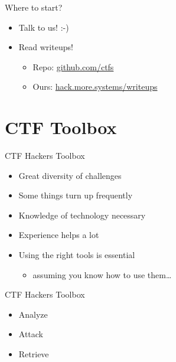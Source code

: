 \begin{frame}
	{Where to start?}

	\begin{itemize}
		\item Talk to us! :-)
	\end{itemize}

	\begin{itemize}
		\item Read writeups!
		\begin{itemize}
			\item Repo: \href{https://github.com/ctfs}{github.com/ctfs}
			\item Ours: \href{https://hack.more.systems/writeups}{hack.more.systems/writeups}
		\end{itemize}
	\end{itemize}

\end{frame}

\section{CTF Toolbox}

\begin{frame}
  {CTF Hackers Toolbox}

  \begin{itemize}
    \item Great diversity of challenges
    \item Some things turn up frequently
    \item Knowledge of technology necessary
    \item Experience helps a lot
  \end{itemize}

  \begin{itemize}
    \item Using the right tools is essential
      \begin{itemize}
        \item assuming you know how to use them\ldots
      \end{itemize}
  \end{itemize}

\end{frame}

\begin{frame}
	{CTF Hackers Toolbox}
	
	\begin{itemize}
		\item Analyze
		\item Attack
		\item Retrieve
	\end{itemize}
	
\end{frame}

